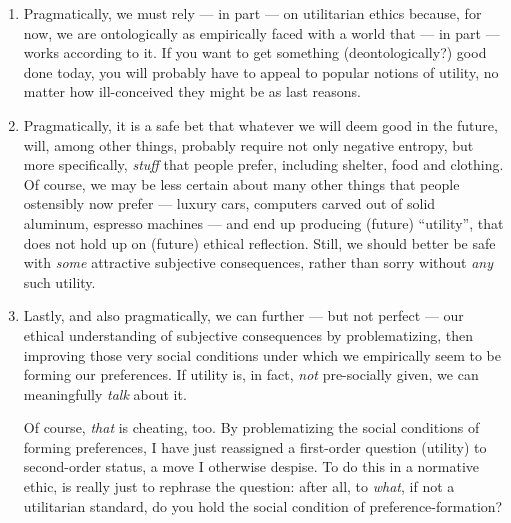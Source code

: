 \begin{enumerate}

	\item
		Pragmatically, we must rely --- in part --- on utilitarian ethics because, for now, we are ontologically as empirically faced with a world that --- in part --- works according to it.
		If you want to get something (deontologically?) good done today, you will probably have to appeal to popular notions of utility, no matter how ill-conceived they might be as last reasons.

	\item
		Pragmatically, it is a safe bet that whatever we will deem good in the future, will, among other things, probably require not only negative entropy, but more specifically, \emph{stuff} that people prefer, including shelter, food and clothing.
		Of course, we may be less certain about many other things that people ostensibly now prefer --- luxury cars, computers carved out of solid aluminum, espresso machines --- and end up producing (future) ``utility'', that does not hold up on (future) ethical reflection.
		Still, we should better be safe with \emph{some} attractive subjective consequences, rather than sorry without \emph{any} such utility.

	\item
		Lastly, and also pragmatically, we can further --- but not perfect --- our ethical understanding of subjective consequences by problematizing, then improving those very social conditions under which we empirically seem to be forming our preferences. %
		If utility is, in fact, \emph{not} pre-socially given, we can meaningfully \emph{talk} about it.

		Of course, \emph{that} is cheating, too.
		By problematizing the social conditions of forming preferences, I have just reassigned a first-order question (utility) to second-order status, a move I otherwise despise.
		To do this in a normative ethic, is really just to rephrase the question: after all, to \emph{what}, if not a utilitarian standard, do you hold the social condition of preference-formation?


\end{enumerate}
